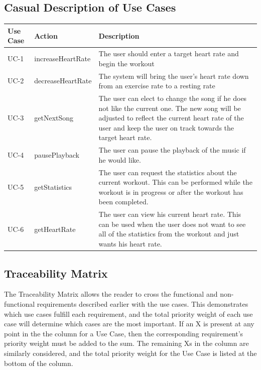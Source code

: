 \documentclass[letterpaper,english, 12pt]{scrreprt}
\begin{document}
\subsection{Casual Description of Use Cases}
\begin{center}
        \begin{tabular}{|C{2cm}|C{2cm}|C{10cm}|}
                \hline
                        Use Case & Action & Description \\
                \hline
                        UC-1 & increaseHeartRate & The user should enter a target heart rate and begin the workout \\
                \hline
                        UC-2 & decreaseHeartRate & The system will bring the user's heart rate down from an exercise rate to a resting rate \\
                \hline
                        UC-3 & getNextSong & The user can elect to change the song if he does not like the current one. The new song will be adjusted to reflect the current heart rate of the user and keep the user on track towards the target heart rate. \\
                \hline
                        UC-4 & pausePlayback & The user can pause the playback of the music if he would like. \\
                \hline
                        UC-5 & getStatistics & The user can request the statistics about the current workout. This can be performed while the workout is in progress or after the workout has been completed. \\
                \hline
                        UC-6 & getHeartRate & The user can view his current heart rate. This can be used when the user does not want to see all of the statistics from the workout and just wants his heart rate. \\
                \hline
        \end{tabular}
\end{center}

\subsection{Traceability Matrix}
The Traceability Matrix allows the reader to cross the functional and non-functional requirements described earlier with the use cases. This demonstrates which use cases fulfill each requirement, and the total priority weight of each use case will determine which cases are the most important. If an X is present at any point in the the column for a Use Case, then the corresponding requirement's priority weight must be added to the sum. The remaining Xs in the column are similarly considered, and the total priority weight for the Use Case is listed at the bottom of the column. 
\end{document}
